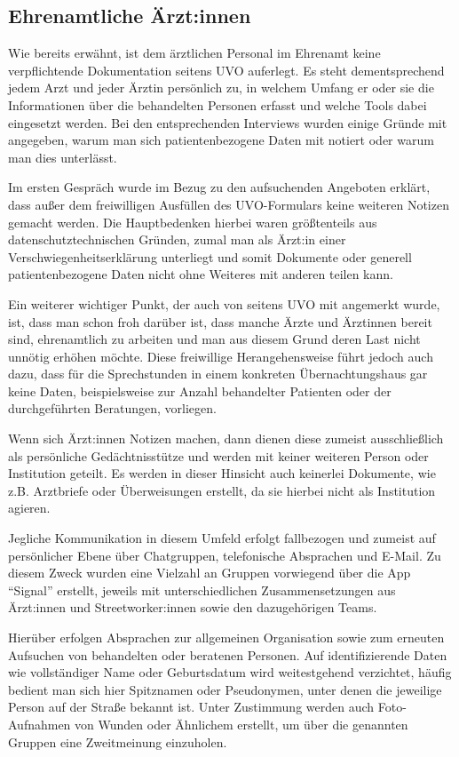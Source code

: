 \subsection{Ehrenamtliche Ärzt:innen}

Wie bereits erwähnt, ist dem ärztlichen Personal im Ehrenamt keine verpflichtende Dokumentation seitens UVO auferlegt. Es steht dementsprechend jedem Arzt und jeder Ärztin persönlich zu, in welchem Umfang er oder sie die Informationen über die behandelten Personen erfasst und welche Tools dabei eingesetzt werden. Bei den entsprechenden Interviews wurden einige Gründe mit angegeben, warum man sich patientenbezogene Daten mit notiert oder warum man dies unterlässt.

Im ersten Gespräch wurde im Bezug zu den aufsuchenden Angeboten erklärt, dass außer dem freiwilligen Ausfüllen des UVO-Formulars keine weiteren Notizen gemacht werden. Die Hauptbedenken hierbei waren größtenteils aus datenschutztechnischen Gründen, zumal man als Ärzt:in einer Verschwiegenheitserklärung unterliegt und somit Dokumente oder generell patientenbezogene Daten nicht ohne Weiteres mit anderen teilen kann.

Ein weiterer wichtiger Punkt, der auch von seitens UVO mit angemerkt wurde, ist, dass man schon froh darüber ist, dass manche Ärzte und Ärztinnen bereit sind, ehrenamtlich zu arbeiten und man aus diesem Grund deren Last nicht unnötig erhöhen möchte. Diese freiwillige Herangehensweise führt jedoch auch dazu, dass für die Sprechstunden in einem konkreten Übernachtungshaus gar keine Daten, beispielsweise zur Anzahl behandelter Patienten oder der durchgeführten Beratungen, vorliegen.

Wenn sich Ärzt:innen Notizen machen, dann dienen diese zumeist ausschließlich als persönliche Gedächtnisstütze und werden mit keiner weiteren Person oder Institution geteilt. Es werden in dieser Hinsicht auch keinerlei Dokumente, wie z.B. Arztbriefe oder Überweisungen erstellt, da sie hierbei nicht als Institution agieren.

Jegliche Kommunikation in diesem Umfeld erfolgt fallbezogen und zumeist auf persönlicher Ebene über Chatgruppen, telefonische Absprachen und E-Mail. Zu diesem Zweck wurden eine Vielzahl an Gruppen vorwiegend über die App \enquote{Signal} erstellt, jeweils mit unterschiedlichen Zusammensetzungen aus Ärzt:innen und Streetworker:innen sowie den dazugehörigen Teams.

Hierüber erfolgen Absprachen zur allgemeinen Organisation sowie zum erneuten Aufsuchen von behandelten oder beratenen Personen. Auf identifizierende Daten wie vollständiger Name oder Geburtsdatum wird weitestgehend verzichtet, häufig bedient man sich hier Spitznamen oder Pseudonymen, unter denen die jeweilige Person auf der Straße bekannt ist. Unter Zustimmung werden auch Foto-Aufnahmen von Wunden oder Ähnlichem erstellt, um über die genannten Gruppen eine Zweitmeinung einzuholen.

